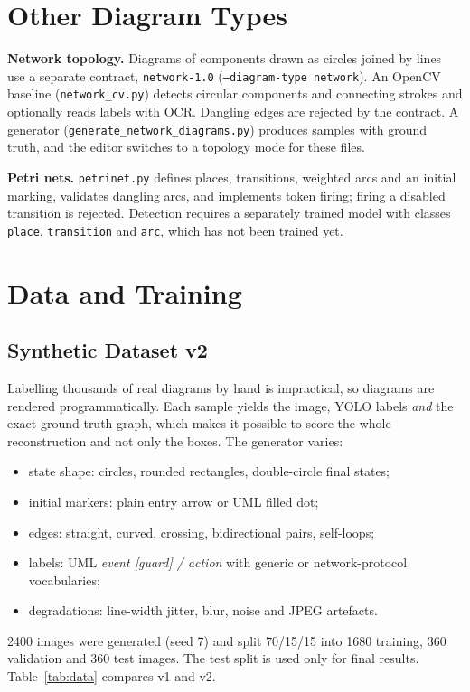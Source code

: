 \documentclass[journal,10pt]{IEEEtran}
\newcommand{\code}[1]{\texttt{#1}}
\begin{document}
\section{Other Diagram Types}
\label{sec:other}
\textbf{Network topology.} Diagrams of components drawn as circles joined by lines use a
separate contract, \code{network-1.0} (\code{--diagram-type network}). An OpenCV baseline
(\code{network\_cv.py}) detects circular components and connecting strokes and optionally
reads labels with OCR. Dangling edges are rejected by the contract. A generator
(\code{generate\_network\_diagrams.py}) produces samples with ground truth, and the editor
switches to a topology mode for these files.

\textbf{Petri nets.} \code{petrinet.py} defines places, transitions, weighted arcs and an
initial marking, validates dangling arcs, and implements token firing; firing a disabled
transition is rejected. Detection requires a separately trained model with classes
\code{place}, \code{transition} and \code{arc}, which has not been trained yet.

\section{Data and Training}
\label{sec:data}

\subsection{Synthetic Dataset v2}
Labelling thousands of real diagrams by hand is impractical, so diagrams are rendered
programmatically. Each sample yields the image, YOLO labels \emph{and} the exact
ground-truth graph, which makes it possible to score the whole reconstruction and not only
the boxes. The generator varies:
\begin{itemize}
\item state shape: circles, rounded rectangles, double-circle final states;
\item initial markers: plain entry arrow or UML filled dot;
\item edges: straight, curved, crossing, bidirectional pairs, self-loops;
\item labels: UML \emph{event [guard] / action} with generic or network-protocol
vocabularies;
\item degradations: line-width jitter, blur, noise and JPEG artefacts.
\end{itemize}
2400 images were generated (seed 7) and split 70/15/15 into 1680 training, 360
validation and 360 test images. The test split is used only for final results.
Table~\ref{tab:data} compares v1 and v2.
\end{document}

